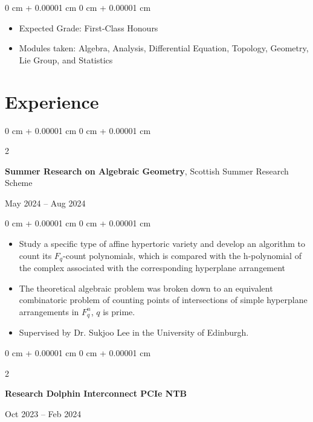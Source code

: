 \documentclass[10pt, letterpaper]{article}
\newenvironment{highlights}{
    \begin{itemize}[
        topsep=0.10 cm,
        parsep=0.10 cm,
        partopsep=0pt,
        itemsep=0pt,
        leftmargin=0 cm + 10pt
    ]
}{
    \end{itemize}
} %
\newenvironment{onecolentry}{
    \begin{adjustwidth}{
        0 cm + 0.00001 cm
    }{
        0 cm + 0.00001 cm
    }
}{
    \end{adjustwidth}
} %
\newenvironment{twocolentry}[2][]{
    \onecolentry
    \def\secondColumn{#2}
    \setcolumnwidth{\fill, 4.5 cm}
    \begin{paracol}{2}
}{
    \switchcolumn \raggedleft \secondColumn
    \end{paracol}
    \endonecolentry
} %
\begin{document}
        \vspace{0.10 cm}
        \begin{onecolentry}
            \begin{highlights}
                \item Expected Grade: First-Class Honours
                \item Modules taken: Algebra, Analysis, Differential Equation, Topology, Geometry, Lie Group, and Statistics
            \end{highlights}
        \end{onecolentry}

    
    \section{Experience}
        
        \begin{twocolentry}{
            May 2024 – Aug 2024
        }
			\textbf{Summer Research on Algebraic Geometry}, Scottish Summer Research Scheme 
		\end{twocolentry}

        \vspace{0.10 cm}
        \begin{onecolentry}
            \begin{highlights}
                \item Study a specific type of affine hypertoric variety and develop an algorithm to count its $F_q$-count polynomials, which is compared with the h-polynomial of the complex associated with the corresponding hyperplane arrangement
				\item The theoretical algebraic problem was broken down to an equivalent combinatoric problem of counting points of intersections of simple hyperplane arrangements in $F^n_q$, $q$ is prime.
				\item Supervised by Dr. Sukjoo Lee in the University of Edinburgh.
            \end{highlights}
        \end{onecolentry}


        \vspace{0.2 cm}
        \begin{twocolentry}{
            Oct 2023 – Feb 2024
        }
            \textbf{Research Dolphin Interconnect PCIe NTB}
		\end{twocolentry}
\end{document}
